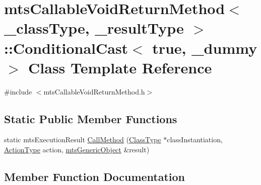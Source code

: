 \hypertarget{classmts_callable_void_return_method_1_1_conditional_cast_3_01true_00_01__dummy_01_4}{}\section{mts\+Callable\+Void\+Return\+Method$<$ \+\_\+class\+Type, \+\_\+result\+Type $>$\+:\+:Conditional\+Cast$<$ true, \+\_\+dummy $>$ Class Template Reference}
\label{classmts_callable_void_return_method_1_1_conditional_cast_3_01true_00_01__dummy_01_4}


{\ttfamily \#include $<$mts\+Callable\+Void\+Return\+Method.\+h$>$}

\subsection*{Static Public Member Functions}
\begin{DoxyCompactItemize}
\item 
static mts\+Execution\+Result \hyperlink{classmts_callable_void_return_method_1_1_conditional_cast_3_01true_00_01__dummy_01_4_ab99bf85a3c5d260e43db1b39f24947cf}{Call\+Method} (\hyperlink{classmts_callable_void_return_method_a2bea77e5dd239ec2a1d3558dd3ca1776}{Class\+Type} $\ast$class\+Instantiation, \hyperlink{classmts_callable_void_return_method_a8fcdd120f008efea73b3d51cbb34f773}{Action\+Type} action, \hyperlink{classmts_generic_object}{mts\+Generic\+Object} \&result)
\end{DoxyCompactItemize}


\subsection{Member Function Documentation}
\hypertarget{classmts_callable_void_return_method_1_1_conditional_cast_3_01true_00_01__dummy_01_4_ab99bf85a3c5d260e43db1b39f24947cf}{}
